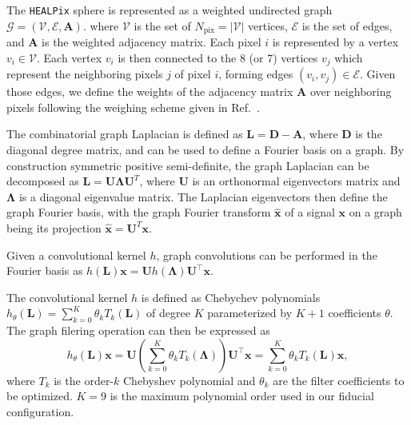 \documentclass[prd,aps,10pt,nofootinbib,twocolumn,superscriptaddress,preprintnumbers,balancelastpage,longbibliography]{revtex4-1}
\begin{document}
The \texttt{HEALPix} sphere is represented as a weighted undirected graph $\mathcal G = (\mathcal V, \mathcal E, \boldsymbol A)$.  where $\mathcal V$ is the set of $N_\mathrm{pix} = |\mathcal V|$ vertices, $\mathcal E$ is the set of edges, and $\boldsymbol A$ is the weighted adjacency matrix. Each pixel $i$ is represented by a vertex $v_i \in \mathcal V$. Each vertex $v_i$ is then connected to the 8 (or 7) vertices $v_j$ which represent the neighboring pixels $j$ of pixel $i$, forming edges $(v_i
, v_j) \in \mathcal E$. Given those edges, we define the weights of the adjacency matrix $\boldsymbol A$ over neighboring pixels following the weighing scheme given in Ref.~\cite{defferrard2020deepsphere}.

The combinatorial graph Laplacian is defined as $\boldsymbol L = \boldsymbol D - \boldsymbol A$, where $\boldsymbol D$ is the diagonal degree matrix, and can be used to define a Fourier basis on a graph. By construction symmetric positive semi-definite, the graph Laplacian can be decomposed as $\boldsymbol L = \boldsymbol U \boldsymbol \Lambda \boldsymbol U^T$, where $\boldsymbol U$ is an orthonormal eigenvectors matrix and $\boldsymbol \Lambda$ is a diagonal eigenvalue matrix. The Laplacian eigenvectors then define the graph Fourier basis, with the graph Fourier transform $\hat{\boldsymbol x}$ of a signal $\boldsymbol x$ on a graph being its projection $\hat{\boldsymbol x} = \boldsymbol U^T \mathbf x$.

Given a convolutional kernel $h$, graph convolutions can be performed in the Fourier basis as $h(\boldsymbol{L}) \boldsymbol{x}=\boldsymbol{U} h(\boldsymbol{\Lambda}) \boldsymbol{U}^{\top} \boldsymbol{x}$.

The convolutional kernel $h$ is defined as Chebychev polynomials $h_{\theta}({\boldsymbol{L}}) = \sum_{k=0}^{K} \theta_{k} T_{k}({\boldsymbol{L}})$ of degree $K$ parameterized by $K + 1$ coefficients $\theta$. The graph filering operation can then be expressed as
\begin{equation}
    h_{\theta}(\boldsymbol{L}) \boldsymbol{x}=\boldsymbol{U}\left(\sum_{k=0}^{K} \theta_{k} T_k(\boldsymbol{\Lambda})\right) \boldsymbol{U}^{\top} \boldsymbol{x}=\sum_{k=0}^{K} \theta_{k} T_k(\boldsymbol{L}) \boldsymbol{x},
\end{equation}
where $T_k$ is the order-$k$ Chebyshev polynomial and $\theta_k$ are the filter coefficients to be optimized. $K=9$ is the maximum polynomial order used in our fiducial configuration.
\end{document}
